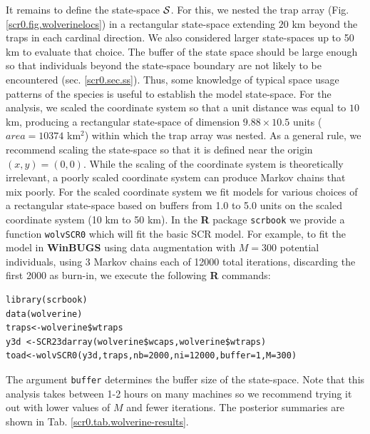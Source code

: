 It remains to define the
state-space ${\cal S}$. For this, we nested the trap array (Fig.
\ref{scr0.fig.wolverinelocs}) in a
 rectangular state-space extending $20$ km beyond the traps in each cardinal
direction.  We also considered larger state-spaces up to 50 km to
evaluate that choice.  The buffer of the state space should be large
enough so that individuals beyond the state-space boundary are not
likely to be encountered
(sec. \ref{scr0.sec.ss}).
Thus, some knowledge of typical space usage
patterns of the species is useful to establish the model state-space.  For the analysis,
we scaled the coordinate system
so that a unit distance was equal to $10$ km, producing a rectangular
state-space of dimension $9.88 \times 10.5$ units ($area = 10374$ km$^2$)
within which the trap array was nested. As a general rule, we
recommend scaling the state-space so that it is defined near the
origin $(x,y)=(0,0)$. While the scaling of the coordinate system is
theoretically irrelevant, a poorly scaled coordinate system can
produce Markov chains that mix poorly.  For the scaled coordinate
system we fit models for various choices of a rectangular state-space
based on
buffers from 1.0 to 5.0 units on the scaled coordinate system (10 km to
50 km). In the {\bf R} package \mbox{\tt scrbook} we provide a
function
\mbox{\tt wolvSCR0} which will fit the basic SCR model. For
example, to fit the model in
{\bf WinBUGS} using data augmentation with $M=300$ potential individuals,
using 3 Markov chains each of 12000 total iterations, discarding the
first 2000 as burn-in, we execute the following {\bf R} commands:
{\small
\begin{verbatim}
library(scrbook)
data(wolverine)
traps<-wolverine$wtraps
y3d <-SCR23darray(wolverine$wcaps,wolverine$wtraps)
toad<-wolvSCR0(y3d,traps,nb=2000,ni=12000,buffer=1,M=300)
\end{verbatim}
}
The argument \mbox{\tt buffer} determines the buffer size of the state-space.
Note that this analysis takes
between 1-2 hours on many machines so we recommend trying it out with
lower values of $M$ and fewer iterations.
The posterior summaries are shown in
Tab. \ref{scr0.tab.wolverine-results}.

